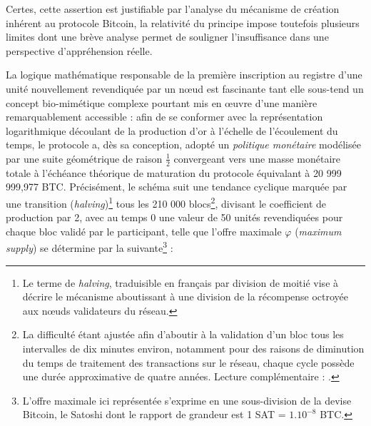 { Certes, cette assertion est justifiable par l'analyse du mécanisme de création inhérent au protocole Bitcoin, la relativité du principe impose toutefois plusieurs limites dont une brève analyse permet de souligner l'insuffisance dans une perspective d'appréhension réelle.\par 
 
 La logique mathématique responsable de la première inscription au registre d'une unité nouvellement revendiquée par un n\oe{}ud est fascinante tant elle sous-tend un concept bio-mimétique complexe pourtant mis en \oe{}uvre d'une manière remarquablement accessible : afin de se conformer avec la représentation logarithmique découlant de la production d'or à l'échelle de l'écoulement du temps, le protocole a, dès sa conception, adopté un \emph{politique monétaire} modélisée par une suite géométrique de raison $\frac{1}{2}$ convergeant vers une masse monétaire totale à l'échéance théorique de maturation du protocole équivalant  à 20 999 999,977 BTC. Précisément, le schéma suit une tendance cyclique marquée par une transition (\emph{\gls{halving}})\footnote{Le terme de \emph{halving}, traduisible en français par \og division de moitié\fg{} vise à décrire le mécanisme aboutissant à une division de la récompense octroyée aux n\oe{}uds validateurs du réseau.} tous les 210 000 blocs\footnote{La difficulté étant ajustée afin d'aboutir à la validation d'un bloc tous les intervalles de dix minutes environ, notamment pour des raisons de diminution du temps de traitement des transactions sur le réseau, chaque cycle possède une durée approximative de quatre années. Lecture complémentaire : .}, divisant le coefficient de production par 2, avec au temps 0 une valeur de 50 unités revendiquées pour chaque bloc validé par le participant, telle que l'offre maximale $\varphi$ (\emph{\gls{maximum supply}}) se détermine par la suivante\footnote{L'offre maximale ici représentée s'exprime en une sous-division de la devise Bitcoin, le Satoshi dont le rapport de grandeur est 1 SAT = $1.10^{-8}$ BTC.} :
 
}
